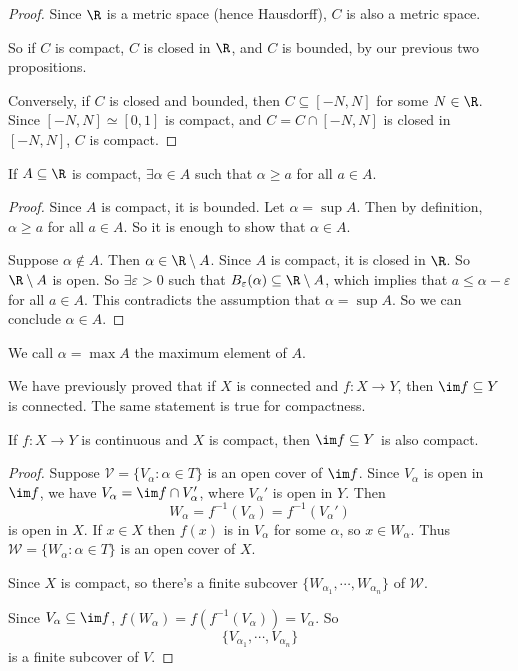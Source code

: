 \documentclass[a4paper]{article}
\begin{document}
\begin{proof}
   Since $\R$ is a metric space (hence Hausdorff), $C$ is also a metric space.

  So if $C$ is compact, $C$ is closed in $\R$, and $C$ is bounded, by our previous two propositions.

  Conversely, if $C$ is closed and bounded, then $C\subseteq [-N, N]$ for some $N\in \R$. Since $[-N, N] \simeq [0, 1]$ is compact, and $C = C\cap [-N, N]$ is closed in $[-N, N]$, $C$ is compact.
\end{proof}

\begin{cor}
  If $A\subseteq \R$ is compact, $\exists \alpha \in A$ such that $\alpha \geq a$ for all $a\in A$.
\end{cor}

\begin{proof}
  Since $A$ is compact, it is bounded. Let $\alpha = \sup A$. Then by definition, $\alpha \geq a$ for all $a\in A$. So it is enough to show that $\alpha \in A$.

  Suppose $\alpha \not\in A$. Then $\alpha \in \R \setminus A$. Since $A$ is compact, it is closed in $\R$. So $\R \setminus A$ is open. So $\exists \varepsilon > 0$ such that $B_\varepsilon(\alpha) \subseteq \R\setminus A$, which implies that $a \leq \alpha - \varepsilon$ for all $a\in A$. This contradicts the assumption that $\alpha = \sup A$. So we can conclude $\alpha\in A$.
\end{proof}

We call $\alpha = \max A$ the maximum element of $A$.

We have previously proved that if $X$ is connected and $f: X\to Y$, then $\im f\subseteq Y$ is connected. The same statement is true for compactness.
\begin{prop}
  If $f: X \to Y$ is continuous and $X$ is compact, then $\im f \subseteq Y$ is also compact.
\end{prop}

\begin{proof}
  Suppose $\mathcal{V} = \{V_\alpha: \alpha \in T\}$ is an open cover of $\im f$. Since $V_\alpha$ is open in $\im f$, we have $V_\alpha = \im f\cap V_\alpha'$, where $V_\alpha'$ is open in $Y$. Then
  \[
    W_\alpha = f^{-1}(V_\alpha) = f^{-1}(V_\alpha')
  \]
  is open in $X$. If $x\in X$  then $f(x)$ is in $V_\alpha$ for some $\alpha$, so $x\in W_\alpha$. Thus $\mathcal{W} = \{W_\alpha: \alpha \in T\}$ is an open cover of $X$.

  Since $X$ is compact, so there's a finite subcover $\{W_{\alpha_1}, \cdots, W_{\alpha_n}\}$ of $\mathcal{W}$.

  Since $V_\alpha \subseteq \im f$, $f(W_\alpha) = f(f^{-1}(V_\alpha)) = V_\alpha$. So
  \[
    \{V_{\alpha_1}, \cdots, V_{\alpha_n}\}
  \]
  is a finite subcover of $V$.
\end{proof}
\end{document}
